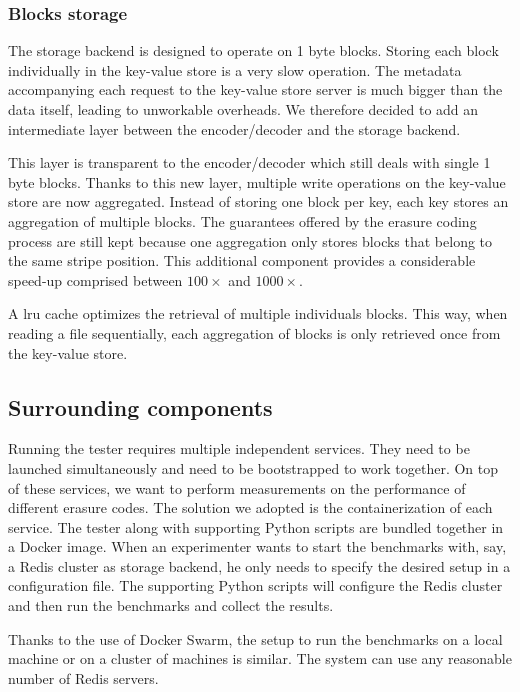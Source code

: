 \subsubsection{Blocks storage}

The storage backend is designed to operate on 1 byte blocks.
Storing each block individually in the key-value store is a very slow operation.
The metadata accompanying each request to the key-value store server is much bigger than the data itself, leading to unworkable overheads.
We therefore decided to add an intermediate layer between the encoder/decoder and the storage backend.

This layer is transparent to the encoder/decoder which still deals with single 1 byte blocks.
Thanks to this new layer, multiple write operations on the key-value store are now aggregated.
Instead of storing one block per key, each key stores an aggregation of multiple blocks.
The guarantees offered by the erasure coding process are still kept because one aggregation only stores blocks that belong to the same stripe position.
This additional component provides a considerable speed-up comprised between $100\times$ and $1000\times$.

A \ac{lru} cache optimizes the retrieval of multiple individuals blocks.
This way, when reading a file sequentially, each aggregation of blocks is only retrieved once from the key-value store.

\subsection{Surrounding components}

Running the tester requires multiple independent services.
They need to be launched simultaneously and need to be bootstrapped to work together.
On top of these services, we want to perform measurements on the performance of different erasure codes.
The solution we adopted is the containerization of each service.
The tester along with supporting Python scripts are bundled together in a Docker image.
When an experimenter wants to start the benchmarks with, say, a Redis cluster as storage backend, he only needs to specify the desired setup in a configuration file.
The supporting Python scripts will configure the Redis cluster and then run the benchmarks and collect the results.

Thanks to the use of Docker Swarm, the setup to run the benchmarks on a local machine or on a cluster of machines is similar.
The system can use any reasonable number of Redis servers.

